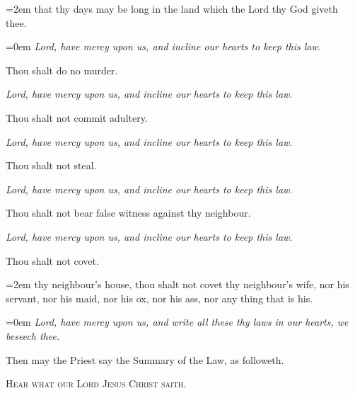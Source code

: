     \par\noindent
    \leftskip=2em
	{\small{that thy days may be long in the land which the Lord thy God giveth thee.}}
	\par
	\leftskip=0em
    \textit{Lord, have mercy upon us, and incline our hearts to keep this law.}
    \par\noindent
    Thou shalt do no murder.\par
    \textit{Lord, have mercy upon us, and incline our hearts to keep this law.}
    \par\noindent
    Thou shalt not commit adultery.\par
    \textit{Lord, have mercy upon us, and incline our hearts to keep this law.}
\par\noindent
    Thou shalt not steal.\par
    \textit{Lord, have mercy upon us, and incline our hearts to keep this law.}
\par\noindent
    Thou shalt not bear false witness against thy neighbour.\par
    \textit{Lord, have mercy upon us, and incline our hearts to keep this law.}
    \par\noindent
    Thou shalt not covet.
    \par\noindent
    \leftskip=2em
	{\small{thy neighbour's house, thou shalt not covet thy neighbour's wife, nor his servant, nor his maid, nor his ox, nor his ass, nor any thing that is his.}}
	\par
	\leftskip=0em
	\textit{Lord, have mercy upon us, and write all these thy laws in our hearts, we beseech thee.}
	
\begin{rubric}
	Then may the Priest say the Summary of the Law, as followeth.
\end{rubric}
\begin{center}
	{\textsc{Hear what our Lord Jesus Christ saith.}}
\end{center}

